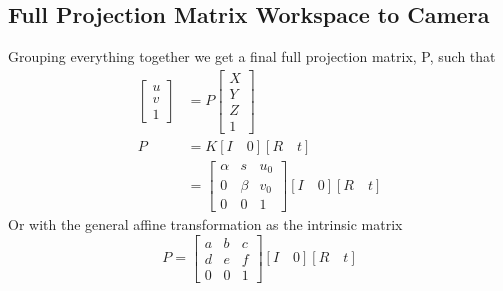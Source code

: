 \subsection{Full Projection Matrix Workspace to Camera}
Grouping everything together we get a final full projection matrix, P, such that
\begin{align*}
\left[\begin{array}{c}u \\ v \\ 1\end{array}\right]&=P\left[\begin{array}{c}X \\ Y \\ Z \\ 1\end{array}\right]\\
P &= K [I \quad 0][R \quad t] \\
&=\left[\begin{array}{ccc} \alpha & s & u_0 \\0 & \beta & v_0 \\ 0 & 0 & 1 \end{array}\right][I \quad 0][R \quad t]
\end{align*}
Or with the general affine transformation as the intrinsic matrix
$$P =\left[\begin{array}{ccc} a & b & c \\d & e & f \\ 0 & 0 & 1 \end{array}\right][I \quad 0][R \quad t]$$

